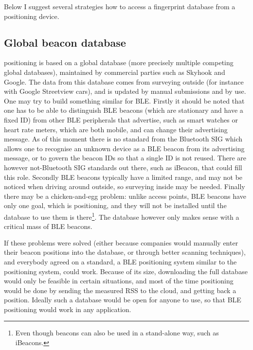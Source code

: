 Below I suggest several strategies how to access a fingerprint database from a positioning device.

\subsection{Global beacon database}
\Wifi positioning is based on a global database (more precisely multiple competing global databases), maintained by commercial parties such as Skyhook and Google.
The data from this database comes from surveying outside (for instance with Google Streetview cars), and is updated by manual submissions and by use.
One may try to build something similar for BLE.
Firstly it should be noted that one has to be able to distinguish BLE beacons (which are stationary and have a fixed ID) from other BLE peripherals that advertise, such as smart watches or heart rate meters, which are both mobile, and can change their advertising message.
As of this moment there is no standard from the Bluetooth SIG which allows one to recognise an unknown device as a BLE beacon from its advertising message, or to govern the beacon IDs so that a single ID is not reused.
There are however not-Bluetooth SIG standards out there, such as iBeacon, that could fill this role.
Secondly BLE beacons typically have a limited range, and may not be noticed when driving around outside, so surveying inside may be needed.
Finally there may be a chicken-and-egg problem: unlike \wifi access points, BLE beacons have only one goal, which is positioning, and they will not be installed until the database to use them is there\footnote{Even though beacons can also be used in a stand-alone way, such as iBeacons.}.
The database however only makes sense with a critical mass of BLE beacons.

If these problems were solved (either because companies would manually enter their beacon positions into the database, or through better scanning techniques), and everybody agreed on a standard, a BLE positioning system similar to the \wifi positioning system, could work.
Because of its size, downloading the full database would only be feasible in certain situations, and most of the time positioning would be done by sending the measured RSS to the cloud, and getting back a position.
Ideally such a database would be open for anyone to use, so that BLE positioning would work in any application.

